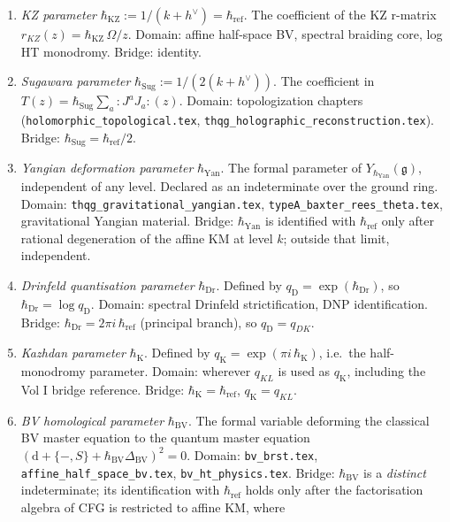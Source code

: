 \begin{enumerate}
\item[(1)] \emph{KZ parameter} $\hbar_{\mathrm{KZ}} := 1/(k+h^\vee) = \hbar_{\mathrm{ref}}$.
 The coefficient of the KZ r-matrix $r_{KZ}(z) = \hbar_{\mathrm{KZ}}\,\Omega/z$.
 Domain: affine half-space BV, spectral braiding core, log HT monodromy.
 Bridge: identity.
\item[(2)] \emph{Sugawara parameter} $\hbar_{\mathrm{Sug}} := 1/(2(k+h^\vee))$.
 The coefficient in $T(z) = \hbar_{\mathrm{Sug}} \sum_a {:}J^a J_a{:}(z)$.
 Domain: topologization chapters (\texttt{holomorphic\_topological.tex},
 \texttt{thqg\_holographic\_reconstruction.tex}).
 Bridge: $\hbar_{\mathrm{Sug}} = \hbar_{\mathrm{ref}}/2$.
\item[(3)] \emph{Yangian deformation parameter} $\hbar_{\mathrm{Yan}}$.
 The formal parameter of $Y_{\hbar_{\mathrm{Yan}}}(\mathfrak{g})$, independent
 of any level. Declared as an indeterminate over the ground ring.
 Domain: \texttt{thqg\_gravitational\_yangian.tex},
 \texttt{typeA\_baxter\_rees\_theta.tex}, gravitational Yangian material.
 Bridge: $\hbar_{\mathrm{Yan}}$ is identified with $\hbar_{\mathrm{ref}}$ only
 after rational degeneration of the affine KM at level $k$; outside that
 limit, independent.
\item[(4)] \emph{Drinfeld quantisation parameter} $\hbar_{\mathrm{Dr}}$.
 Defined by $q_{\mathrm{D}} = \exp(\hbar_{\mathrm{Dr}})$, so
 $\hbar_{\mathrm{Dr}} = \log q_{\mathrm{D}}$.
 Domain: spectral Drinfeld strictification, DNP identification.
 Bridge: $\hbar_{\mathrm{Dr}} = 2\pi i\,\hbar_{\mathrm{ref}}$ (principal branch),
 so $q_{\mathrm{D}} = q_{DK}$.
\item[(5)] \emph{Kazhdan parameter} $\hbar_{\mathrm{K}}$.
 Defined by $q_{\mathrm{K}} = \exp(\pi i\,\hbar_{\mathrm{K}})$, i.e.\ the
 half-monodromy parameter.
 Domain: wherever $q_{KL}$ is used as $q_{\mathrm{K}}$, including the Vol I
 bridge reference.
 Bridge: $\hbar_{\mathrm{K}} = \hbar_{\mathrm{ref}}$, $q_{\mathrm{K}} = q_{KL}$.
\item[(6)] \emph{BV homological parameter} $\hbar_{\mathrm{BV}}$.
 The formal variable deforming the classical BV master equation to the
 quantum master equation $(\mathrm{d}+\{-,S\}+\hbar_{\mathrm{BV}}\Delta_{\mathrm{BV}})^{2}=0$.
 Domain: \texttt{bv\_brst.tex}, \texttt{affine\_half\_space\_bv.tex},
 \texttt{bv\_ht\_physics.tex}.
 Bridge: $\hbar_{\mathrm{BV}}$ is a \emph{distinct} indeterminate; its
 identification with $\hbar_{\mathrm{ref}}$ holds only after the factorisation
 algebra of CFG is restricted to affine KM, where

\end{enumerate}
